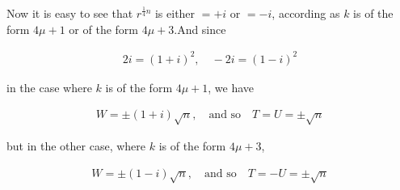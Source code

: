 Now it is easy to see that $r^{\frac14n}$ is either $=+i$ or $=-i$, according as $k$ is of the form $4\mu+1$ or of the form $4\mu+3$.\quad And since

\[
\begin{aligned}
2i=(1+i)^2,\quad -2i=(1-i)^2
\end{aligned}
\]

in the case where $k$ is of the form $4\mu+1$, we have

\[
\begin{aligned}
W=\pm(1+i)\surd n,\quad\text{and so}\quad T=U=\pm\surd n
\end{aligned}
\]

but in the other case, where $k$ is of the form $4\mu+3$,

\[
\begin{aligned}
W=\pm(1-i)\surd n,\quad\text{and so}\quad T=-U=\pm\surd n
\end{aligned}
\]
